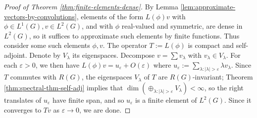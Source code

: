 \documentclass[reqno]{amsart} 
\def\eps{\varepsilon}
\begin{document}
\begin{proof}
[Proof of Theorem \ref{thm:finite-elements-dense}]
  By Lemma \ref{lem:approximate-vectors-by-convolutions},
  elements of the form $L(\phi) v$ with
  $\phi \in L^1(G), v \in L^2(G)$, and with $\phi$ real-valued and symmetric,
  are dense in $L^2(G)$, so it
  suffices to approximate such elements by finite functions.
  Thus consider some such elements $\phi,v$.
  The operator $T := L(\phi)$ is compact and self-adjoint.
  Denote by $V_\lambda$ its eigenspaces.
  Decompose $v = \sum v_\lambda$ with $v_\lambda \in V_\lambda$.
  For each $\eps > 0$, we then have
  $L(\phi) v = u_\eps + O(\eps)$ where
  $u_\eps := \sum_{\lambda : |\lambda| > \eps} \lambda v_\lambda$.
  Since $T$ commutes with $R(G)$,
  the eigenspaces $V_\lambda$ of $T$ are $R(G)$-invariant;
  Theorem \ref{thm:spectral-thm-self-adj}
  implies that $\dim( \oplus_{\lambda : |\lambda| > \eps}
  V_\lambda) < \infty$,
  so the right translates of $u_\eps$ have finite span,
  and so $u_\eps$ is a finite element of $L^2(G)$.
  Since it converges to $T v$ as $\eps \rightarrow 0$, we are done.
\end{proof}


\end{document}
